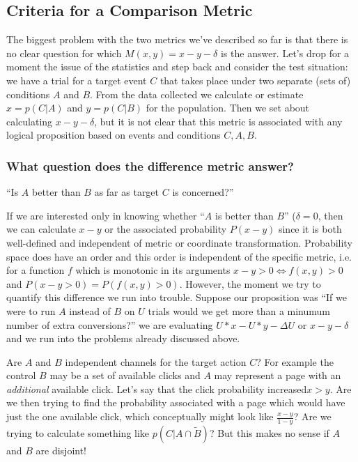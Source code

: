 \documentclass[12pt]{report}
\newcommand{\comp}[1]{\widetilde{#1}}
\begin{document}
\subsection{Criteria for a Comparison Metric}\label{sec:criteria}
The biggest problem with the two metrics we've described so far is
that there is no clear question for which \(M(x,y) = x-y-\delta\) is the
answer. Let's drop for a moment the issue of the statistics and step back and consider the test situation: we have a
trial for a target event \(C\) that takes place under two separate
(sets of) conditions \(A\) and \(B\). From the data collected we
calculate or estimate \(x=p(C|A)\) and \(y=p(C|B)\) for the
population. Then we set about calculating
\(x-y-\delta\), but it is not clear that this metric is
associated with any logical proposition based on events and conditions
\(C,A,B\).

\subsubsection{What question does the difference metric answer?}
``Is \(A\) better than \(B\) as far as target \(C\) is concerned?''

If we are interested only in knowing whether ``\(A\) is better than
\(B\)'' (\(\delta = 0\), then we can calculate \(x-y\) or the
associated probability \(P(x-y)\) since it is both well-defined and
independent of metric or coordinate transformation. Probability space
does have an order and this order is independent of the specific
metric, i.e. for a function \(f\) which is monotonic in its arguments
\(x-y>0 \Leftrightarrow f(x,y) >0\) and \(P(x-y>0) = P(f(x,y) >
0)\). However, the moment we try to quantify this difference we run
into trouble. Suppose our proposition was ``If we were to run \(A\)
instead of \(B\) on \(U\) trials would we get more than a minumum
number of extra conversions?'' we are evaluating \(U*x - U*y -\Delta
U\) or \(x-y - \delta\) and we run into the problems already discussed
above.

Are \(A\) and \(B\) independent channels for the target
action \(C\)? For example the control \(B\) may be a set of available clicks and
\(A\) may represent a page with an {\em additional} available click. Let's say that the click probability increased\(x>y\). Are
we then trying to find the probability associated with a page which
would have just the one available click, which conceptually might look like \(\frac{x-y}{1-y}\)? Are we trying to calculate something
like \(p(C|A\cap \comp{B})\)? But this makes no sense if \(A\) and \(B\)
are disjoint!
\end{document}
